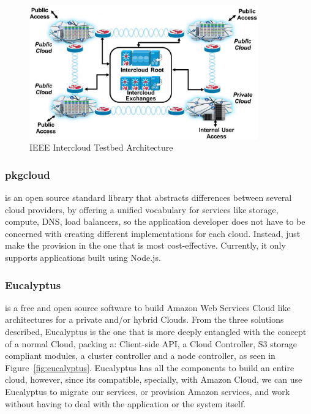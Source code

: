  
\begin{figure}[hb]
    \centering
    \includegraphics[width=0.88\textwidth]{img/testbed-technology.jpg}
    \caption{IEEE Intercloud Testbed Architecture}
    \label{fig:IEEE Intercloud Testbed Architecture}
\end{figure}

\subsubsection{pkgcloud}\label{par:pkgcloud}

is an open source standard library that abstracts differences between several cloud providers, by offering a unified vocabulary for services like storage, compute, DNS, load balancers, so the application developer does not have to be concerned with creating different implementations for each cloud. Instead, just make the provision in the one that is most cost-effective. Currently, it only supports applications built using Node.js.

\subsubsection{Eucalyptus}\label{par:Eucalyptus}

is a free and open source software to build Amazon Web Services Cloud like architectures for a private and/or hybrid Clouds. From the three solutions described, Eucalyptus is the one that is more deeply entangled with the concept of a normal Cloud, packing a: Client-side API, a Cloud Controller, S3 storage compliant modules, a cluster controller and a node controller, as seen in Figure~\ref{fig:eucalyptus}. Eucalyptus has all the components to build an entire cloud, however, since its compatible, specially, with Amazon Cloud, we can use Eucalyptus to migrate our services, or provision Amazon services, and work without having to deal with the application or the system itself.

